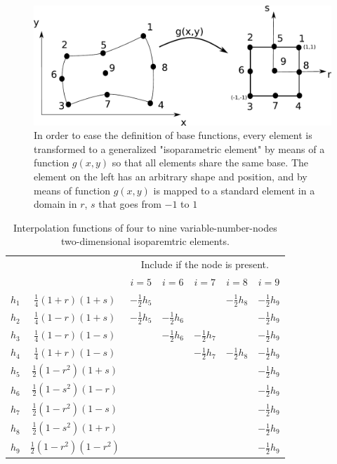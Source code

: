 \begin{figure}
\centering
\includegraphics[scale=0.5]{./img/2D_gen_elem.pdf}
\caption{In order to ease the definition of base functions, every element is transformed to a generalized "isoparametric element" by means of a function $g(x,y)$ \cite{Bathe1996} so that all elements share the same base. The element on the left has an arbitrary shape and position, and by means of function $g(x,y)$ is mapped to a standard element in a domain in $r$, $s$ that goes from $-1$ to $1$ }
\end{figure}
\begin{center}
\begin{table}
\centering
    \begin{tabular}{r|c|c|c|c|c|c|}
       \multicolumn{2}{c}{~} & \multicolumn{5}{c}{Include if the node is present.}\\
       \multicolumn{1}{c}{~} & \multicolumn{1}{c|}{~} & $i=5$ & $i=6$ & $i=7$ & $i=8$ & $i=9$ \\      
    $h_1$ & $\frac{1}{4}\left(1+r\right)\left(1+s\right)$    & $-\frac{1}{2}h_5$ & ~     & ~ & $-\frac{1}{2}h_8$ & $-\frac{1}{2}h_9$ \\
    $h_2$ & $\frac{1}{4}\left(1-r\right)\left(1+s\right)$    & $-\frac{1}{2}h_5$ & $-\frac{1}{2}h_6$     &  &  & $-\frac{1}{2}h_9$ \\
    $h_3$ & $\frac{1}{4}\left(1-r\right)\left(1-s\right)$    &     & $-\frac{1}{2}h_6$ & $-\frac{1}{2}h_7$ &  & $-\frac{1}{2}h_9$ \\
    $h_4$ & $\frac{1}{4}\left(1+r\right)\left(1-s\right)$    &      &      & $-\frac{1}{2}h_7$ & $-\frac{1}{2}h_8$ & $-\frac{1}{2}h_9$ \\
    $h_5$ & $\frac{1}{2}\left(1-r^2\right)\left(1+s\right)$  &  & & &  & $-\frac{1}{2}h_9$ \\
    $h_6$ & $\frac{1}{2}\left(1-s^2\right)\left(1-r\right)$  & & &  &  & $-\frac{1}{2}h_9$ \\
    $h_7$ & $\frac{1}{2}\left(1-r^2\right)\left(1-s\right)$  & & & & &$-\frac{1}{2}h_9$ \\
    $h_8$ & $\frac{1}{2}\left(1-s^2\right)\left(1+r\right)$  & & & & & $-\frac{1}{2}h_9$ \\
    $h_9$ & $\frac{1}{2}\left(1-r^2\right)\left(1-r^2\right)$& & & & & $-\frac{1}{2}h_9$\\
    \end{tabular}
\caption{Interpolation functions of four to nine variable-number-nodes two-dimensional isoparemtric elements.}
\label{tab:int_funct}
\end{table}
\end{center}
